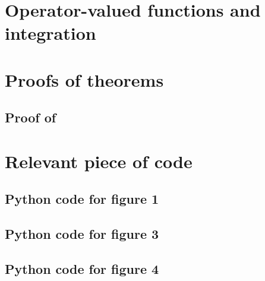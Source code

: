 
\chapter{Operator-valued functions and integration}
\label{ch:operator-valued_functions_and_integration}

\chapter{Proofs of theorems}
\label{ch:proof_of_theorems}
\section{Proof of }

\chapter{Relevant piece of code}
\label{ch:relevant_piece_of_code}
\section{Python code for figure 1}
{\scriptsize
{}}

\section{Python code for figure 3}
{\scriptsize
{}}

\section{Python code for figure 4}
{\scriptsize
{}}

